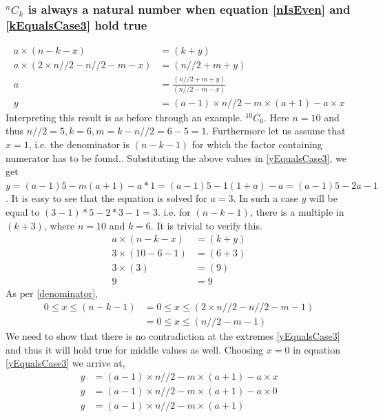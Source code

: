 \documentclass[10pt, twoside]{article}
\newcommand*{\Combination}[2]{{}^{#1}C_{#2}}%
\begin{document}
\subsubsection{$\Combination{n}{k}$ is always a natural number when equation \eqref{nIsEven} and \eqref{kEqualsCase3} hold true}\label{ProofkEqualsCase3}
\begin{align}
	a \times (n-k-x) &= (k+y) \nonumber \\
	a \times (2\times n//2 - n//2 - m - x) &= (n//2 + m + y) \nonumber \\
	a &= \frac{(n//2 +m + y)}{(n//2 -m - x)} \nonumber \\
	y &= (a-1)\times n//2 - m \times (a+1) - a\times x \label{yEqualsCase3}	
\end{align}
Interpreting this result is as before through an example.\newline
$\Combination{10}{6}$. Here $n = 10$ and thus $n//2 = 5, k = 6, m = k - n//2 = 6 - 5 = 1$. Furthermore let us assume that $x = 1$, i.e. the denominator is $(n-k-1)$ for which the factor containing numerator has to be found.\newline.
Substituting the above values in \eqref{yEqualsCase3}, we get  $y = (a-1)5-m(a+1)-a*1 = (a-1)5-1(1+a)-a = (a-1)5-2a-1$\newline. 
It is easy to see that the equation is solved for $a = 3$. In such a case $y$ will be equal to $(3-1)*5-2*3-1 = 3$. i.e. for $(n-k-1)$, there is a multiple in $(k+3)$, where $n=10$ and $k=6$. It is trivial to verify this.
\begin{align*}
	a \times (n-k-x) &= (k+y) \\
	3 \times (10-6-1) &= (6+3) \\
	3 \times (3) &= (9) \\
	9 &= 9 
\end{align*}
As per \eqref{denominator}, 
\begin{align}
	0 \leq x \leq (n-k-1) &= 0 \leq x \leq (2\times n//2-n//2-m-1) \nonumber \\
	&= 0 \leq x \leq (n//2-m-1) \label{LimitOfXforYEqualsCase3}
\end{align}
We need to show that there is no contradiction at the extremes \eqref{yEqualsCase3} and thus it will hold true for middle values as well.
Choosing $x = 0$ in equation \eqref{yEqualsCase3} we arrive at,
\begin{align*}
	y &= (a-1)\times n//2 - m \times (a+1) - a\times x \\
	y &= (a-1)\times n//2 - m \times (a+1) - a\times 0 \\
	y &= (a-1)\times n//2 - m \times (a+1)
\end{align*}
\end{document}
